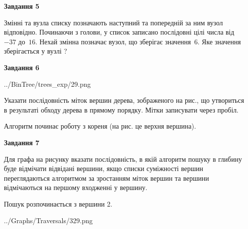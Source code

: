 \documentclass[12pt, ukrainian]{article}
\begin{document}
{\begin {large}
{\begin {center}\textbf{Завдання 5}\end {center}}\par
Змінні  та  вузла списку позначають наступний та попередній за ним вузол відповідно. Починаючи з голови, у список записано послідовні цілі числа від~$-37$ до~$16$. Нехай змінна  позначає вузол, що зберігає значення~$6$.
Яке значення зберігається у вузлі  ?\par
\newpage

{\begin {center}\textbf{Завдання 6}\end {center}}\par

\begin{center}
	{../BinTree/trees_exp/29.png}
\end{center}
Указати послідовність міток вершин дерева, зображеного на рис., що утвориться в результаті обходу дерева в прямому порядку. Мітки записувати через пробіл.\par Алгоритм починає роботу з кореня (на рис. це верхня вершина).\par
\newpage

{\begin {center}\textbf{Завдання 7}\end {center}}\par
Для графа на рисунку вказати послідовність, в якій алгоритм пошуку в глибину буде відмічати відвідані вершини, якщо списки суміжності вершин переглядаються алгоритмом за зростанням міток вершин та вершини відмічаються на першому вход\-женні у вершину.\par
Пошук розпочинається з вершини 2.\par

\begin{center}
	{../Graphs/Traversals/329.png}
\end{center}\par
\newpage


\end{large}}
\end{document}

